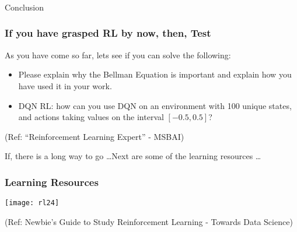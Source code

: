 \begin{frame}[fragile]\frametitle{}
\begin{center}
{\Large Conclusion}
\end{center}
\end{frame}

\begin{frame}\frametitle{If you have grasped RL by now, then, Test}
As you have come so far, lets see if you can solve the following:

\begin{itemize}
\item Please explain why the Bellman Equation is important and explain how you have used it in your work.
\item DQN RL: how can you use DQN on an environment with 100 unique states, and actions taking values on the interval $[-0.5, 0.5]$?
\end{itemize}

{\tiny (Ref: ``Reinforcement Learning Expert'' - MSBAI)}

If, there is a long way to go \ldots  Next are some of the learning resources \ldots
\end{frame}



\begin{frame}[fragile]\frametitle{Learning Resources}
\begin{center}
\texttt{[image: rl24]}
\end{center}
{\tiny (Ref: Newbie’s Guide to Study Reinforcement Learning - Towards Data Science)}
\end{frame}

